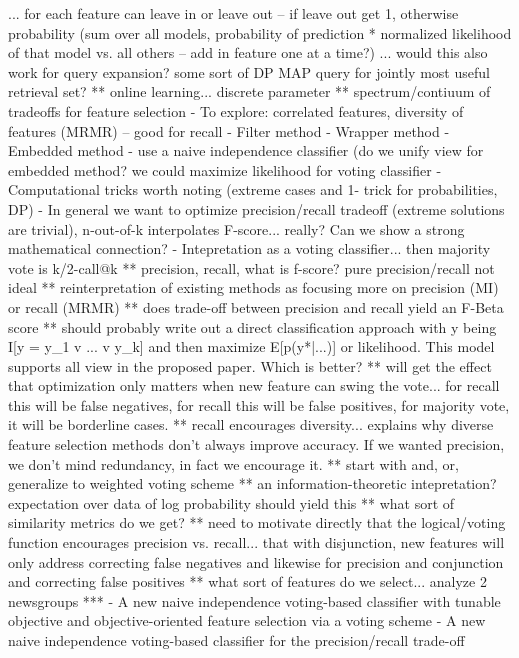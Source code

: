 ... for each feature can leave in or leave out -- if leave out get 1, otherwise probability (sum over all models, probability of prediction 
* normalized likelihood of that model vs. all others -- add in feature one at a time?)
... would this also work for query expansion?  some sort of DP MAP query for jointly most useful retrieval set?
** online learning... discrete parameter
** spectrum/contiuum of tradeoffs for feature selection
- To explore: correlated features, diversity of features (MRMR) -- good for recall
- Filter method
- Wrapper method
- Embedded method - use a naive independence classifier
  (do we unify view for embedded method?  we could maximize likelihood for voting classifier	
- Computational tricks worth noting (extreme cases and 1- trick for probabilities, DP)
- In general we want to optimize precision/recall tradeoff (extreme solutions are trivial), n-out-of-k interpolates F-score... really?  Can 
we show a strong mathematical connection?
- Intepretation as a voting classifier... then majority vote is k/2-call@k
** precision, recall, what is f-score?  pure precision/recall not ideal
** reinterpretation of existing methods as focusing more on precision (MI) or recall (MRMR)
** does trade-off between precision and recall yield an F-Beta score
** should probably write out a direct classification approach with y being I[y = y_1 v ... v y_k] and then maximize E[p(y*|...)] or 
likelihood.  This model supports all view in the proposed paper.  Which is better?
** will get the effect that optimization only matters when new feature can swing the vote... for recall this will be false negatives, for 
recall this will be false positives, for majority vote, it will be borderline cases.
** recall encourages diversity... explains why diverse feature selection methods don't always improve accuracy.  If we wanted precision, we 
don't mind redundancy, in fact we encourage it.
** start with and, or, generalize to weighted voting scheme
** an information-theoretic intepretation?  expectation over data of log probability should yield this
** what sort of similarity metrics do we get?
** need to motivate directly that the logical/voting function encourages precision vs. recall... that with disjunction, new features will 
only address correcting false negatives and likewise for precision and conjunction and correcting false positives
** what sort of features do we select... analyze 2 newsgroups
***
- A new naive independence voting-based classifier with tunable objective and objective-oriented feature selection via a voting scheme
- A new naive independence voting-based classifier for the precision/recall trade-off
